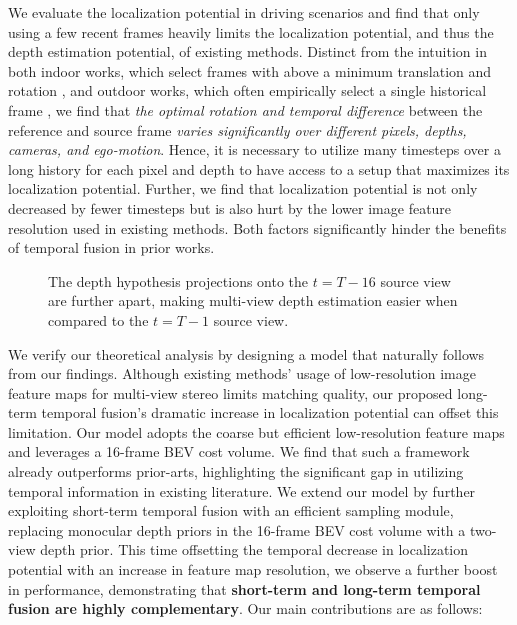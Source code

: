 \documentclass[runningheads, hyperfootnotes=false]{article}
\begin{document}
We evaluate the localization potential in driving scenarios and find that only using a few recent frames heavily limits the localization potential, and thus the depth estimation potential, of existing methods. Distinct from the intuition in both indoor works, which select frames with above a minimum translation and rotation \citep{Hou2019MultiViewSB,Sun2021NeuralReconRC}, and outdoor works, which often empirically select a single historical frame \citep{huang2022bevdet4d,wang2022monocular,liu2022petrv2}, we find that \textit{the optimal rotation and temporal difference} between the reference and source frame \textit{varies significantly over different pixels, depths, cameras, and ego-motion}. Hence, it is necessary to utilize many timesteps over a long history for each pixel and depth to have access to a setup that maximizes its localization potential. Further, we find that localization potential is not only decreased by fewer timesteps but is also hurt by the lower image feature resolution used in existing methods. Both factors significantly hinder the benefits of temporal fusion in prior works.
\begin{figure*}[t]
  \centering
  \captionsetup{aboveskip=0pt}\captionsetup{belowskip=0pt}\caption{The depth hypothesis projections onto the $t = T-16$ source view are further apart, making multi-view depth estimation easier when compared to the $t = T-1$ source view.}
  \label{fig:localization_potential}
\end{figure*} 
We verify our theoretical analysis by designing a model that naturally follows from our findings. Although existing methods' usage of low-resolution image feature maps for multi-view stereo limits matching quality, our proposed long-term temporal fusion's dramatic increase in localization potential can offset this limitation. Our model adopts the coarse but efficient low-resolution feature maps and leverages a 16-frame BEV cost volume. We find that such a framework already outperforms prior-arts, highlighting the significant gap in utilizing temporal information in existing literature. We extend our model by further exploiting short-term temporal fusion with an efficient sampling module, replacing monocular depth priors in the 16-frame BEV cost volume with a two-view depth prior. This time offsetting the temporal decrease in localization potential with an increase in feature map resolution, we observe a further boost in performance, demonstrating that \textbf{short-term and long-term temporal fusion are highly complementary}. Our main contributions are as follows:
\end{document}
